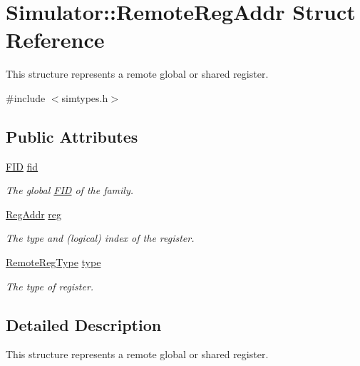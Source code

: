 \hypertarget{struct_simulator_1_1_remote_reg_addr}{\section{Simulator\+:\+:Remote\+Reg\+Addr Struct Reference}
\label{struct_simulator_1_1_remote_reg_addr}
}


This structure represents a remote global or shared register.  




{\ttfamily \#include $<$simtypes.\+h$>$}

\subsection*{Public Attributes}
\begin{DoxyCompactItemize}
\item 
\hyperlink{struct_simulator_1_1_f_i_d}{F\+I\+D} \hyperlink{struct_simulator_1_1_remote_reg_addr_ae0ae7ccbf41930eb6d730892cc81fcf1}{fid}
\begin{DoxyCompactList}\small\item\em The global \hyperlink{struct_simulator_1_1_f_i_d}{F\+I\+D} of the family. \end{DoxyCompactList}\item 
\hyperlink{struct_simulator_1_1_reg_addr}{Reg\+Addr} \hyperlink{struct_simulator_1_1_remote_reg_addr_a8d68911ba43e8673fc27cf04bc6b48ef}{reg}
\begin{DoxyCompactList}\small\item\em The type and (logical) index of the register. \end{DoxyCompactList}\item 
\hyperlink{namespace_simulator_aac96aab43eac55fb7f08383889feb2d8}{Remote\+Reg\+Type} \hyperlink{struct_simulator_1_1_remote_reg_addr_a5f1f93aab024bf76a1b53907a935ec90}{type}
\begin{DoxyCompactList}\small\item\em The type of register. \end{DoxyCompactList}\end{DoxyCompactItemize}


\subsection{Detailed Description}
This structure represents a remote global or shared register. 

